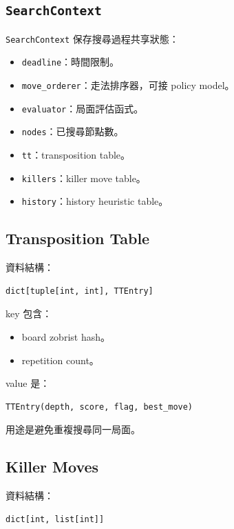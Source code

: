 \documentclass[12pt,a4paper,fontset=none]{ctexart}
\begin{document}
\subsection{\texttt{SearchContext}}

\texttt{SearchContext} 保存搜尋過程共享狀態：

\begin{itemize}
  \item \texttt{deadline}：時間限制。
  \item \texttt{move\_orderer}：走法排序器，可接 policy model。
  \item \texttt{evaluator}：局面評估函式。
  \item \texttt{nodes}：已搜尋節點數。
  \item \texttt{tt}：transposition table。
  \item \texttt{killers}：killer move table。
  \item \texttt{history}：history heuristic table。
\end{itemize}

\subsection{Transposition Table}

資料結構：

\begin{lstlisting}[style=cmd]
dict[tuple[int, int], TTEntry]
\end{lstlisting}

key 包含：

\begin{itemize}
  \item board zobrist hash。
  \item repetition count。
\end{itemize}

value 是：

\begin{lstlisting}[style=cmd]
TTEntry(depth, score, flag, best_move)
\end{lstlisting}

用途是避免重複搜尋同一局面。

\subsection{Killer Moves}

資料結構：

\begin{lstlisting}[style=cmd]
dict[int, list[int]]
\end{lstlisting}
\end{document}
